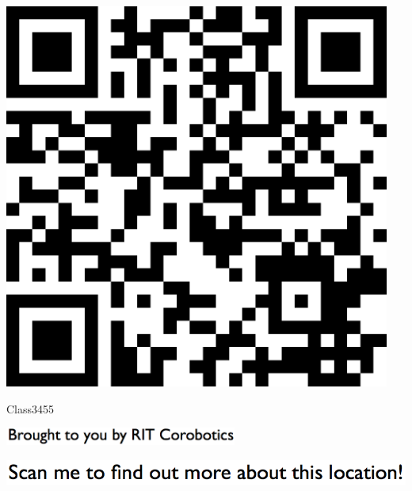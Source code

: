 \documentclass[letterpaper]{article}
\begin{document}
 \begingroup 
 \centerline{\includegraphics[scale=1,width=5in,height=5in]{Class3455.png}} 
 \endgroup 
 \vspace*{\fill} 

 \hfill{\small Class3455} 

  \vspace{0.7in} 
 
 \centerline{\includegraphics[scale=1,width=3in]{text-bottom.png}} 
 
 \pagebreak 
{} 
 \vspace*{\fill} 
 
  \centerline{\includegraphics[scale=1,width=6in]{text-top.png}} 
 
 \vspace{0.5in} 
 
\end{document}
